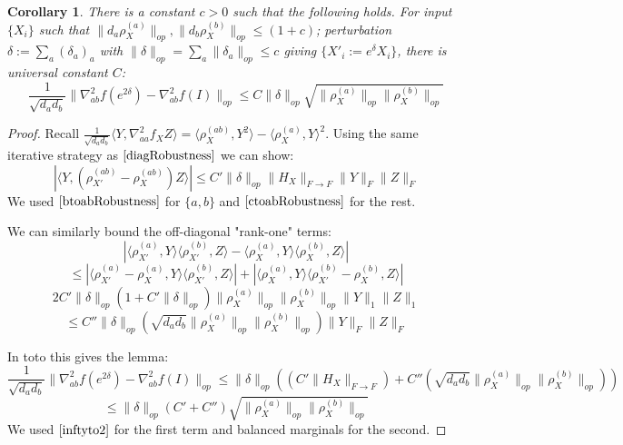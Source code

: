 \documentclass{article}
\newtheorem{corollary}[theorem]{Corollary}
\begin{document}
\begin{corollary} \label{offdiagRobustness}
There is a constant $c>0$ such that the following holds. For input $\{X_{i}\}$ such that $\|d_{a} \rho_{X}^{(a)}\|_{op}, \|d_{b} \rho_{X}^{(b)}\|_{op} \leq (1+c)$; perturbation $\delta := \sum_{a} (\delta_{a})_{a}$ with $\|\delta\|_{op} = \sum_{a} \|\delta_{a}\|_{op} \leq c$ giving $\{X'_{i} := e^{\delta} X_{i} \}$, there is universal constant $C$:
\[ \frac{1}{\sqrt{d_{a} d_{b}}} \|\nabla^{2}_{ab} f(e^{2 \delta}) - \nabla^{2}_{ab} f(I)\|_{op} \leq C \|\delta\|_{op} \sqrt{\|\rho_{X}^{(a)}\|_{op} \|\rho_{X}^{(b)}\|_{op}}     \]
\end{corollary}
\begin{proof}
Recall $\frac{1}{\sqrt{d_{a} d_{b}}} \langle Y, \nabla^{2}_{aa} f_{X} Z \rangle = \langle \rho_{X}^{(ab)}, Y^{2} \rangle - \langle \rho_{X}^{(a)}, Y \rangle^{2}$. Using the same iterative strategy as $\ref{diagRobustness}$ we can show: 
\[ |\langle Y, (\rho_{X'}^{(ab)} - \rho_{X}^{(ab)}) Z \rangle| \leq C' \|\delta\|_{op} \|H_{X}\|_{F \to F} \|Y\|_{F} \|Z\|_{F}    \]
We used $\ref{btoabRobustness}$ for $\{a,b\}$ and $\ref{ctoabRobustness}$ for the rest. 

We can similarly bound the off-diagonal "rank-one" terms:
\[ |\langle \rho_{X'}^{(a)}, Y \rangle \langle \rho_{X'}^{(b)}, Z \rangle - \langle \rho_{X}^{(a)}, Y \rangle \langle \rho_{X}^{(b)}, Z \rangle|    \]
\[ \leq |\langle \rho_{X'}^{(a)} - \rho_{X}^{(a)}, Y \rangle \langle \rho_{X'}^{(b)}, Z \rangle| + |\langle \rho_{X}^{(a)}, Y \rangle \langle \rho_{X'}^{(b)} - \rho_{X}^{(b)}, Z \rangle|   \]
\[ 2 C' \|\delta\|_{op} (1+C'\|\delta\|_{op}) \|\rho_{X}^{(a)}\|_{op} \|\rho_{X}^{(b)}\|_{op} \|Y\|_{1} \|Z\|_{1}    \]
\[ \leq C'' \|\delta\|_{op} (\sqrt{d_{a} d_{b}} \|\rho_{X}^{(a)}\|_{op} \|\rho_{X}^{(b)}\|_{op}) \|Y\|_{F} \|Z\|_{F}    \]

In toto this gives the lemma:
\[ \frac{1}{\sqrt{d_{a} d_{b}}} \|\nabla^{2}_{ab} f(e^{2 \delta}) - \nabla^{2}_{ab} f(I)\|_{op} \leq \|\delta\|_{op}((C' \|H_{X}\|_{F \to F}) + C'' (\sqrt{d_{a} d_{b}} \|\rho_{X}^{(a)}\|_{op} \|\rho_{X}^{(b)}\|_{op})) \]
\[ \leq \|\delta\|_{op} (C' + C'') \sqrt{\|\rho_{X}^{(a)}\|_{op} \|\rho_{X}^{(b)}\|_{op}}     \]
We used $\ref{inftyto2}$ for the first term and balanced marginals for the second. 
\end{proof}
\end{document}
